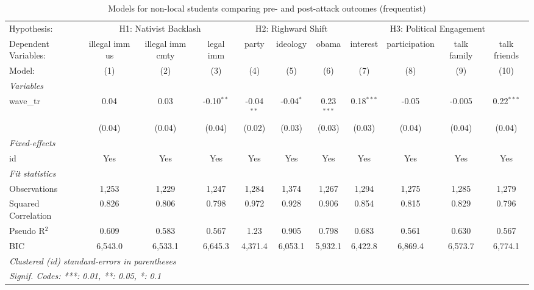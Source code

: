 
\begin{table}[htbp]
   \caption{\label{tab:first_diff_FE_tr} Models for non-local students comparing pre- and post-attack outcomes (frequentist)}
   \centering
   \begin{tabular}{lcccccccccc}
      \tabularnewline \midrule \midrule
      Hypothesis: & \multicolumn{3}{c}{H1: Nativist Backlash} & \multicolumn{3}{c}{H2: Righward Shift} & \multicolumn{4}{c}{H3: Political Engagement} \\ 
      Dependent Variables: & illegal imm us & illegal imm cmty & legal imm    & party        & ideology    & obama        & interest     & participation & talk family & talk friends\\  
      Model:               & (1)            & (2)              & (3)          & (4)          & (5)         & (6)          & (7)          & (8)           & (9)         & (10)\\  
      \midrule
      \emph{Variables}\\
      wave\_tr             & 0.04           & 0.03             & -0.10$^{**}$ & -0.04$^{**}$ & -0.04$^{*}$ & 0.23$^{***}$ & 0.18$^{***}$ & -0.05         & -0.005      & 0.22$^{***}$\\   
                           & (0.04)         & (0.04)           & (0.04)       & (0.02)       & (0.03)      & (0.03)       & (0.03)       & (0.04)        & (0.04)      & (0.04)\\   
      \midrule
      \emph{Fixed-effects}\\
      id                   & Yes            & Yes              & Yes          & Yes          & Yes         & Yes          & Yes          & Yes           & Yes         & Yes\\  
      \midrule
      \emph{Fit statistics}\\
      Observations         & 1,253          & 1,229            & 1,247        & 1,284        & 1,374       & 1,267        & 1,294        & 1,275         & 1,285       & 1,279\\  
      Squared Correlation  & 0.826          & 0.806            & 0.798        & 0.972        & 0.928       & 0.906        & 0.854        & 0.815         & 0.829       & 0.796\\  
      Pseudo R$^2$         & 0.609          & 0.583            & 0.567        & 1.23         & 0.905       & 0.798        & 0.683        & 0.561         & 0.630       & 0.567\\  
      BIC                  & 6,543.0        & 6,533.1          & 6,645.3      & 4,371.4      & 6,053.1     & 5,932.1      & 6,422.8      & 6,869.4       & 6,573.7     & 6,774.1\\  
      \midrule \midrule
      \multicolumn{11}{l}{\emph{Clustered (id) standard-errors in parentheses}}\\
      \multicolumn{11}{l}{\emph{Signif. Codes: ***: 0.01, **: 0.05, *: 0.1}}\\
   \end{tabular}
\end{table}


